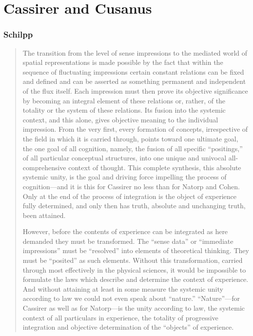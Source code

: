 \section{Cassirer and Cusanus}

\subsubsection{Schilpp}

\begin{quote}
    The transition from the level of sense impressions to the mediated world of spatial representations is made possible by the fact that within the sequence of fluctuating impressions certain constant relations can be fixed and defined and can be asserted as something permanent and independent of the flux itself.  Each impression must then prove its objective significance by becoming an integral element of these relations or, rather, of the totality or the system of these relations.  Its fusion into the systemic context, and this alone, gives objective meaning to the individual impression.  From the very first, every formation of concepts, irrespective of the field in which it is carried through, points toward one ultimate goal, the one goal of all cognition, namely, the fusion of all specific ``positings,'' of all particular conceptual structures, into one unique and univocal all-comprehensive context of thought.  This complete synthesis, this absolute systemic unity, is the goal and driving force impelling the process of cognition---and it is this for Cassirer no less than for Natorp and Cohen.  Only at the end of the process of integration is the object of experience fully determined, and only then has truth, absolute and unchanging truth, been attained.  

    However, before the contents of experience can be integrated as here demanded they must be transformed.  The ``sense data'' or ``immediate impressions'' must be ``resolved'' into elements of theoretical thinking.  They must be ``posited'' as such elements.  Without this transformation, carried through most effectively in the physical sciences, it would be impossible to formulate the laws which describe and determine the context of experience.  And without attaining at least in some measure the systemic unity according to law we could not even speak about ``nature.''  ``Nature''---for Cassirer as well as for Natorp---is the unity according to law, the systemic context of all particulars in experience, the totality of progressive integration and objective determination of the ``objects'' of experience.  


\end{quote}
